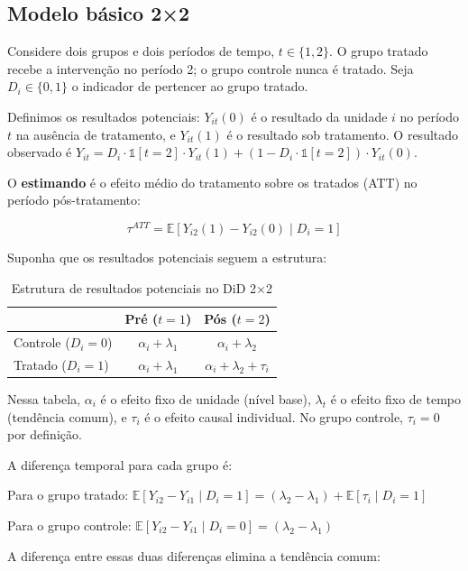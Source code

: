 \documentclass[
]{article}
\begin{document}
\subsection{Modelo básico 2×2}\label{modelo-buxe1sico-22}

Considere dois grupos e dois períodos de tempo, \(t \in \{1, 2\}\). O grupo tratado recebe a intervenção no período 2; o grupo controle nunca é tratado. Seja \(D_i \in \{0, 1\}\) o indicador de pertencer ao grupo tratado.

Definimos os resultados potenciais: \(Y_{it}(0)\) é o resultado da unidade \(i\) no período \(t\) na ausência de tratamento, e \(Y_{it}(1)\) é o resultado sob tratamento. O resultado observado é \(Y_{it} = D_i \cdot \mathbb{1}[t=2] \cdot Y_{it}(1) + (1 - D_i \cdot \mathbb{1}[t=2]) \cdot Y_{it}(0)\).

O \textbf{estimando} é o efeito médio do tratamento sobre os tratados (ATT) no período pós-tratamento:

\[
\tau^{ATT} = \mathbb{E}[Y_{i2}(1) - Y_{i2}(0) \mid D_i = 1]
\]

Suponha que os resultados potenciais seguem a estrutura:

\begin{table}[!h]
\centering
\caption{\label{tab:tabela-did}Estrutura de resultados potenciais no DiD 2×2}
\centering
\begin{tabular}[t]{>{}l|cc}
\toprule
  & Pré ($t = 1$) & Pós ($t = 2$)\\
\midrule
Controle ($D_i = 0$) & $\alpha_i + \lambda_1$ & $\alpha_i + \lambda_2$\\
Tratado ($D_i = 1$) & $\alpha_i + \lambda_1$ & $\alpha_i + \lambda_2 + \tau_i$\\
\bottomrule
\end{tabular}
\end{table}

Nessa tabela, \(\alpha_i\) é o efeito fixo de unidade (nível base), \(\lambda_t\) é o efeito fixo de tempo (tendência comum), e \(\tau_i\) é o efeito causal individual. No grupo controle, \(\tau_i = 0\) por definição.

A diferença temporal para cada grupo é:

Para o grupo tratado: \(\mathbb{E}[Y_{i2} - Y_{i1} \mid D_i = 1] = (\lambda_2 - \lambda_1) + \mathbb{E}[\tau_i \mid D_i = 1]\)

Para o grupo controle: \(\mathbb{E}[Y_{i2} - Y_{i1} \mid D_i = 0] = (\lambda_2 - \lambda_1)\)

A diferença entre essas duas diferenças elimina a tendência comum:
\end{document}
